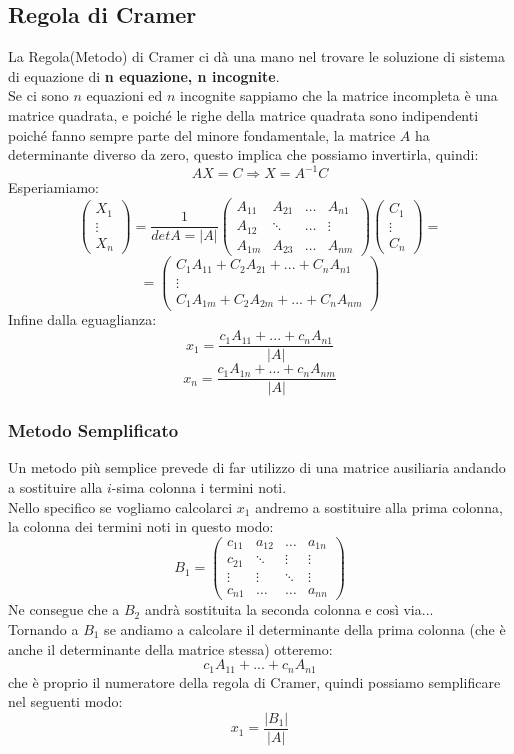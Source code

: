 \subsection{Regola di Cramer}
La Regola(Metodo) di Cramer ci dà una mano nel trovare le soluzione di sistema di equazione di \textbf{n equazione, n incognite}.\\
Se ci sono $n$ equazioni ed $n$ incognite sappiamo che la matrice
incompleta è una matrice quadrata, e poiché le righe della matrice quadrata sono indipendenti poiché fanno sempre parte del minore fondamentale, la matrice $A$ ha determinante diverso da zero, questo implica che possiamo invertirla, quindi:
$$ AX=C \Rightarrow X=A^{-1}C $$
Esperiamiamo:
$$ 
\begin{pmatrix}
X_1 \\ \vdots \\ X_n
\end{pmatrix}
= 
\frac{1}{detA = |A|}
\begin{pmatrix}
A_{11} & A_{21} & \dots & A_{n1} \\
A_{12} & \ddots & \dots & \vdots \\
A_{1m} & A_{23} & \dots & A_{nm}
\end{pmatrix}
\begin{pmatrix}
C_1 \\ \vdots \\ C_n
\end{pmatrix}
=
$$
$$ 
=
\begin{pmatrix}
C_1A_{11}+C_2A_{21}+...+C_nA_{n1} \\
\vdots \\
C_1A_{1m}+C_2A_{2m}+...+C_nA_{nm} 
\end{pmatrix}
$$
Infine dalla eguaglianza:
$$ x_1 = \frac{c_1A_{11}+...+c_nA_{n1}}{|A|} $$
$$ x_n = \frac{c_1A_{1n}+...+c_nA_{nm}}{|A|} $$

\subsubsection{Metodo Semplificato}
Un metodo più semplice prevede di far utilizzo di una matrice ausiliaria andando a sostituire alla $i$-sima colonna i termini noti.\\
Nello specifico se vogliamo calcolarci $x_1$ andremo a sostituire alla prima colonna, la colonna dei termini noti in questo modo:
$$
B_1 = 
\begin{pmatrix}
c_{11} & a_{12} & \dots & a_{1n} \\
c_{21} & \ddots & \vdots & \vdots \\
\vdots & \vdots & \ddots & \vdots \\
c_{n1} & \dots & \dots & a_{nn}
\end{pmatrix}
$$
Ne consegue che a $B_2$ andrà sostituita la seconda colonna e così via...\\
Tornando a $B_1$ se andiamo a calcolare il determinante della prima colonna (che è anche il determinante della matrice stessa) otteremo:
$$ c_1A_{11}+...+c_nA_{n1} $$
che è proprio il numeratore della regola di Cramer, quindi possiamo semplificare nel seguenti modo:
$$ x_1 = \frac{|B_1|}{|A|} $$

